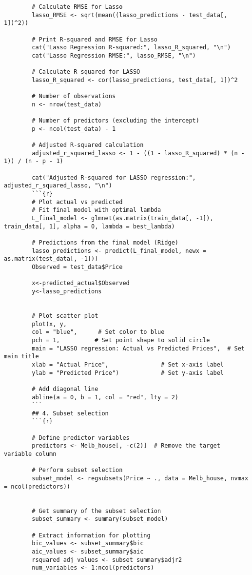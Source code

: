 \documentclass[12pt,doublespace]{article}
\begin{document}
\begin{lstlisting}
		# Calculate RMSE for Lasso
		lasso_RMSE <- sqrt(mean((lasso_predictions - test_data[, 1])^2))
		
		# Print R-squared and RMSE for Lasso
		cat("Lasso Regression R-squared:", lasso_R_squared, "\n")
		cat("Lasso Regression RMSE:", lasso_RMSE, "\n")
		
		# Calculate R-squared for LASSO
		lasso_R_squared <- cor(lasso_predictions, test_data[, 1])^2
		
		# Number of observations
		n <- nrow(test_data)
		
		# Number of predictors (excluding the intercept)
		p <- ncol(test_data) - 1
		
		# Adjusted R-squared calculation
		adjusted_r_squared_lasso <- 1 - ((1 - lasso_R_squared) * (n - 1)) / (n - p - 1)
		
		cat("Adjusted R-squared for LASSO regression:", adjusted_r_squared_lasso, "\n")
		```{r}
		# Plot actual vs predicted
		# Fit final model with optimal lambda
		L_final_model <- glmnet(as.matrix(train_data[, -1]), train_data[, 1], alpha = 0, lambda = best_lambda)
		
		# Predictions from the final model (Ridge)
		lasso_predictions <- predict(L_final_model, newx = as.matrix(test_data[, -1]))
		Observed = test_data$Price
		
		x<-predicted_actual$Observed
		y<-lasso_predictions
		
		
		# Plot scatter plot
		plot(x, y, 
		col = "blue",      # Set color to blue
		pch = 1,          # Set point shape to solid circle
		main = "LASSO regression: Actual vs Predicted Prices",  # Set main title
		xlab = "Actual Price",               # Set x-axis label
		ylab = "Predicted Price")            # Set y-axis label
		
		# Add diagonal line
		abline(a = 0, b = 1, col = "red", lty = 2)
		```
		## 4. Subset selection 
		```{r}
		
		# Define predictor variables
		predictors <- Melb_house[, -c(2)]  # Remove the target variable column
		
		# Perform subset selection
		subset_model <- regsubsets(Price ~ ., data = Melb_house, nvmax = ncol(predictors))
		
		
		# Get summary of the subset selection
		subset_summary <- summary(subset_model)
		
		# Extract information for plotting
		bic_values <- subset_summary$bic
		aic_values <- subset_summary$aic
		rsquared_adj_values <- subset_summary$adjr2
		num_variables <- 1:ncol(predictors)
		

\end{lstlisting}
\end{document}
